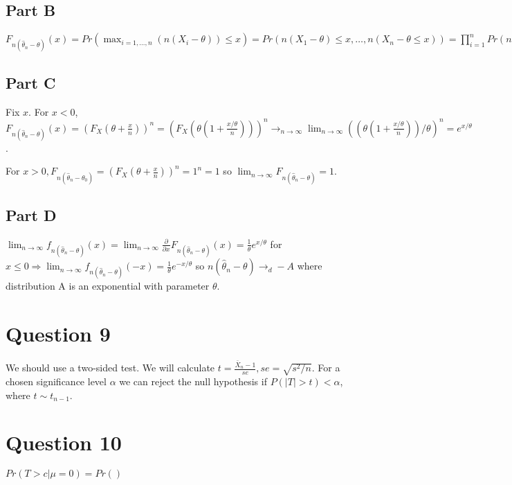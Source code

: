 \documentclass[11pt]{article} %
\begin{document}
\subsection{Part B}
$F_{n(\hat{\theta}_n - \theta)}(x) = Pr(\max_{i=1,\dots,n}(n(X_i - \theta))\leq x) = Pr(n(X_1 - \theta) \leq x,\dots,n(X_n - \theta \leq x)) = \prod_{i=1}^n Pr(n(X_i - \theta)\leq x) = \prod_{i=1}^nPr(X_i\leq \theta + \frac{x}{n}) = Pr(X_i\leq \theta + \frac{x}{n})^n = (F_X(\theta + \frac{x}{n}))^n.$
\subsection{Part C}
Fix $x$. For $x<0$, $F_{n(\hat{\theta}_n - \theta)}(x) =(F_X(\theta + \frac{x}{n}))^n = (F_X(\theta(1 + \frac{x/\theta}{n})))^n  \rightarrow_{n\rightarrow \infty} \lim_{n\rightarrow \infty} ((\theta(1 + \frac{x/\theta}{n}))/\theta)^n = e^{x/\theta} $.

For $x>0, F_{n(\hat{\theta}_n - \theta_0)} = (F_{X}(\theta + \frac{x}{n}))^n = 1^n =1$ so $\lim_{n\rightarrow \infty}F_{n(\hat{\theta}_n - \theta)} = 1.$
\subsection{Part D}
$\lim_{n\rightarrow \infty}f_{n(\hat{\theta}_n - \theta)}(x) =\lim_{n\rightarrow \infty} \frac{\partial}{\partial x}F_{n(\hat{\theta}_n - \theta)}(x) = \frac{1}{\theta}e^{x/\theta}  $ for $x\leq0 \Rightarrow \lim_{n\rightarrow \infty}f_{n(\hat{\theta}_n - \theta)}(-x) = \frac{1}{\theta}e^{-x/\theta} $ so $n(\hat{\theta}_n - \theta)\rightarrow_d -A$ where distribution A is an exponential with parameter $\theta$.

\section{Question 9} %
We should use a two-sided test. We will calculate $t = \frac{\bar{X}_n - 1}{se},se = \sqrt{s^2/n}.$ For a chosen significance level $\alpha$ we can reject the null hypothesis if $P(|T|> t) < \alpha$, where $t \sim t_{n-1}$.

\section{Question 10}  %
$Pr(T>c|\mu = 0) = Pr()$
\end{document}
